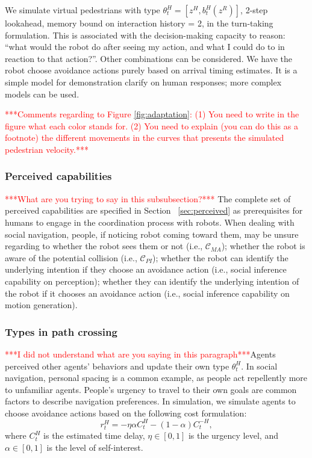 \documentclass[letterpaper, 10 pt, conference]{ieeeconf}  %
\begin{document}
We simulate virtual pedestrians with type $\theta^H_t = [z^H, b^H_t(z^R)]$, 2-step lookahead, memory bound on interaction history = 2, in the turn-taking formulation. This is associated with the decision-making capacity to reason: ``what would the robot do after seeing my action, and what I could do to in reaction to that action?''. Other combinations can be considered. We have the robot choose avoidance actions purely based on arrival timing estimates. It is a simple model for demonstration clarify on human responses; more complex models can be used.

\textcolor{red}{***Comments regarding to Figure \ref{fig:adaptation}: (1) You need to write in the figure what each color stands for. (2) You need to explain (you can do this as a footnote) the different movements in the curves that presents the simulated pedestrian velocity.***}

\subsubsection{Perceived capabilities}
\textcolor{red}{***What are you trying to say in this subsubsection?***} The complete set of perceived capabilities are specified in Section ~\ref{sec:perceived} as 
prerequisites for humans to engage in the coordination process with robots. When dealing with social navigation, people, if noticing robot coming toward them, may be unsure regarding to whether the robot sees them or not (i.e., $\mathcal{C}_{MA}$); whether the robot is aware of the potential collision (i.e., $\mathcal{C}_{PI}$); whether the robot can identify the underlying intention if they choose an avoidance action (i.e., social inference capability on perception); whether they can identify the underlying intention of the robot if it chooses an avoidance action (i.e., social inference capability on motion generation). 

\subsubsection{Types in path crossing}
\textcolor{red}{***I did not understand what are you saying in this paragraph***}Agents perceived other agents' behaviors and update their own type $\theta^H_t$. In social navigation, personal spacing is a common example, as people act repellently more to unfamiliar agents. People's urgency to travel to their own goals are common factors to describe navigation preferences. In simulation, we simulate agents to choose avoidance actions based on the following cost formulation:
\begin{equation}
  r^H_t = -\eta \alpha C^H_t  -(1-\alpha) C^{-H}_t,
\end{equation}
where $C^H_t$ is the estimated time delay, $\eta \in [0,1]$ is the urgency 
level, and $\alpha \in [0,1]$ is the level of self-interest.
\end{document}
